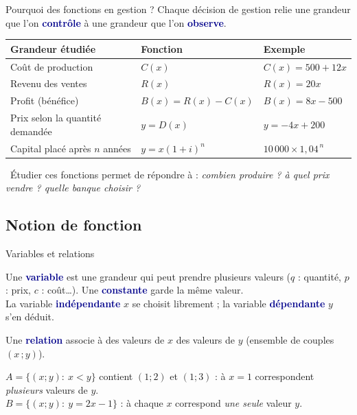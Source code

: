 \documentclass[aspectratio=169,11pt]{beamer}
\newcommand{\key}[1]{\textcolor{DarkBlue}{\textbf{#1}}}
\begin{document}
\begin{frame}{Pourquoi des fonctions en gestion ?}
	Chaque décision de gestion relie une grandeur que l'on \key{contrôle} à une grandeur que l'on \key{observe}.
	\medskip
	\begin{center}\small
		\renewcommand{\arraystretch}{1.3}
		\begin{tabular}{lll}
			\toprule
			\textbf{Grandeur étudiée} & \textbf{Fonction} & \textbf{Exemple}\\
			\midrule
			Coût de production & $C(x)$ & $C(x)=500+12x$\\
			Revenu des ventes & $R(x)$ & $R(x)=20x$\\
			Profit (bénéfice) & $B(x)=R(x)-C(x)$ & $B(x)=8x-500$\\
			Prix selon la quantité demandée & $y=D(x)$ & $y=-4x+200$\\
			Capital placé après $n$ années & $y=x(1+i)^n$ & $10\,000\times1{,}04^{\,n}$\\
			\bottomrule
		\end{tabular}
	\end{center}
	\begin{applicationbox}
		\faLightbulb\ Étudier ces fonctions permet de répondre à : \emph{combien produire ? à quel prix vendre ? quelle banque choisir ?}
	\end{applicationbox}
\end{frame}

\subsection{Notion de fonction}

\begin{frame}{Variables et relations}
	\begin{definitionbox}[Variables]
		Une \key{variable} est une grandeur qui peut prendre plusieurs valeurs ($q$ : quantité, $p$ : prix, $c$ : coût\ldots). Une \key{constante} garde la même valeur.\\[2pt]
		La variable \key{indépendante} $x$ se choisit librement ; la variable \key{dépendante} $y$ s'en déduit.
	\end{definitionbox}
	\vspace{0.2cm}
	\begin{definitionbox}[Relation]
		Une \key{relation} associe à des valeurs de $x$ des valeurs de $y$ (ensemble de couples $(x\,;y)$).
	\end{definitionbox}
	\vspace{0.2cm}
	\begin{exemplebox}
		$A=\{(x;y):\ x<y\}$ contient $(1;2)$ et $(1;3)$ : à $x=1$ correspondent \emph{plusieurs} valeurs de $y$.\\
		$B=\{(x;y):\ y=2x-1\}$ : à chaque $x$ correspond \emph{une seule} valeur $y$.
	\end{exemplebox}
\end{frame}
\end{document}
